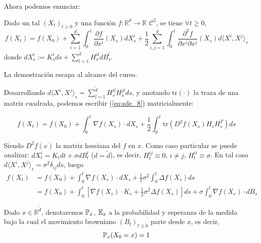 Ahora podemos enunciar: 
\begin{theorem}
        Dado un tal $(X_t)_{t \ge 0}$  y una función $f: \mathbb{R}^d \to \mathbb{R}$ $\mathcal{C}^2$, 
        se tiene $\forall t \ge 0$, 
        \begin{equation*}
                \label{eq:sde_8}
                \tag{$\star$}
                f(X_t) = f(X_0) + \sum_{i=1}^{d} \int_{0}^{t} \frac{\partial f}{\partial x^i} (X_s) dX_s^i 
                + \frac{1}{2} \sum_{i,j = 1}^{d} \int_{0}^{t}
                \frac{\partial^2 f}{\partial x^i \partial x^j}(X_s) d \langle X^i, X^j \rangle _s
        \end{equation*}
        donde $dX_s^i := K_s^i ds + \sum_{l=1}^{\tilde{d}} H_{s}^{il} dB_s^l$.
\end{theorem}

La demostración escapa al alcance del curso. 

\newp Desarrollando $d \langle X^i, X^j \rangle _s = \sum_{l=1}^{\tilde{d}} H_{s}^{il} H_{s}^{jl} ds$, y 
anotando $\text{tr}(\cdot)$ la traza de una matriz cuadrada, podemos escribir (\ref{eq:sde_8}) 
matricialmente: 

\begin{equation*}
        f(X_t) = f(X_0) + \int_{0}^{t} \nabla f(X_s) \cdot dX_s 
        + \frac{1}{2} \int_{0}^{t} \text{tr} \left( D^2 f(X_s) H_s H_s^{T} \right) ds
\end{equation*}

Siendo $D^2 f(x)$ la matriz hessiana del $f$ en $x$. Como caso particular se puede 
analizar: $dX_t^i = K_t dt + \sigma dB_t^i$ ($d = \tilde{d}$), es decir, $H_t^{ij} \equiv 0$, $i \neq j$, 
$H_t^{ii} \equiv \sigma$. En tal caso $d \langle X^i, X^j \rangle _s = \sigma^2 \delta_{ij} ds$, luego 
\begin{align*}
        f(X_t) 
        &= f(X_0) + \int_{0}^{t} \nabla f(X_s) \cdot d X_s + \frac{1}{2} \sigma^2 
        \int_0^{t} \Delta f(X_s) ds \\ 
        &= f(X_0) + \int_{0}^{t} \left[ \nabla f(X_s) \cdot K_s + \frac{1}{2}
        \sigma^2 \Delta f(X_s) \right] ds
        + \sigma \int_{0}^{t} \nabla f(X_s) \cdot dB_s
\end{align*}

\begin{definition}
        Dado $x \in \mathbb{R}^{\tilde{d}}$, denotaremos $\P_x$, $\E_x$ a la probabilidad y esperanza 
        de la medida bajo la cual el movimiento browniano $(B_t)_{t \ge 0}$ parte desde $x$, es
        decir, 
        \begin{equation*}
                \P_x (X_0 = x) = 1
        \end{equation*}
\end{definition}

